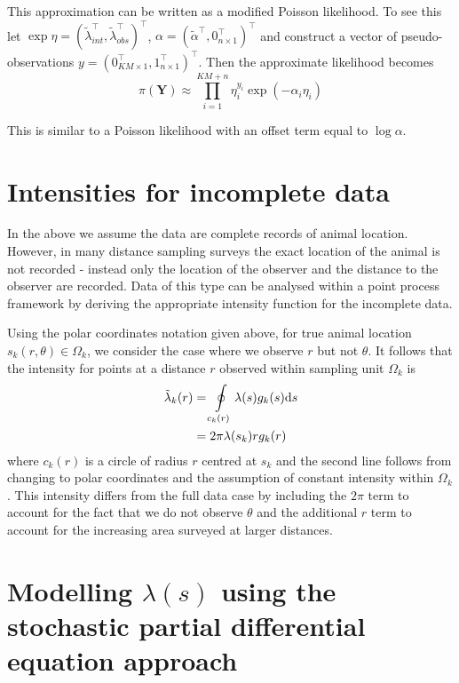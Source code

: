 \documentclass[preprint,12pt]{elsarticle}
\newcommand{\bm}{\boldsymbol}  %
\newcommand{\tl}{\tilde{\lambda}}   %
\begin{document}
This approximation can be written as a modified Poisson likelihood.  To see this let $\exp \eta = (\tl_{int}^\intercal, \tl_{obs}^\intercal)^\intercal$,
$\alpha = (\tilde{\alpha}^\intercal, 0_{n \times 1}^\intercal)^\intercal$ and construct a vector of pseudo-observations $y = (0_{KM\times 1}^\intercal, 1_{n \times 1}^\intercal)^\intercal$.  Then the approximate likelihood becomes
\begin{equation}
\pi(\bm{Y}) \approx \prod_{i=1}^{KM + n} \eta_i^{y_i}\exp(-\alpha_i\eta_i)
\end{equation}

This is similar to a Poisson likelihood with an offset term equal to $\log\alpha$.


\section*{Intensities for incomplete data}

In the above we assume the data are complete records of animal location.  However, in many distance sampling surveys the exact location of the animal is not recorded - instead only the location of the observer and the distance to the observer are recorded.  Data of this type can be analysed within a point process framework by deriving the appropriate intensity function for the incomplete data.

Using the polar coordinates notation given above, for true animal location $s_k(r, \theta) \in \Omega_k$, we consider the case where we observe $r$ but not $\theta$.  It follows that the intensity for points at a distance $r$ observed within sampling unit $\Omega_k$ is
\begin{align}
\tl_k(r) &= \oint\displaylimits_{c_k(r)} \lambda(s)g_k(s)\mathrm{d}s \nonumber \\
&= 2\pi\lambda(s_k)rg_k(r)
\end{align}
 where $c_k(r)$ is a circle of radius $r$ centred at $s_k$ and the second line follows from changing to polar coordinates and the assumption of constant intensity within $\Omega_k$.  This intensity differs from the full data case by including the $2\pi$  term to account for the fact that we do not observe $\theta$ and the additional $r$ term to account for the increasing area surveyed at larger distances.

\section*{Modelling $\lambda(s)$ using the stochastic partial differential equation approach}
\end{document}
